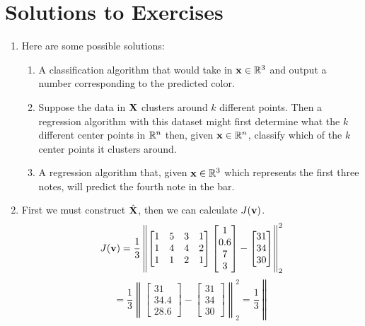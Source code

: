 \section{Solutions to Exercises}
\begin{enumerate}
    \item Here are some possible solutions:
    \begin{enumerate}
        \item A classification algorithm that would take in $\vx \in \R^3$ and output a number corresponding to the predicted color.
        \item Suppose the data in $\MX$ clusters around $k$ different points. Then a regression algorithm with this dataset might first determine what the $k$ different center points in $\R^n$ then, given $\vx \in \R^n$, classify which of the $k$ center points it clusters around.
        \item A regression algorithm that, given $\vx \in \R^3$ which represents the first three notes, will predict the fourth note in the bar.
    \end{enumerate}
    \item First we must construct $\hat{\MX}$, then we can calculate $J(\vv)$.
    $$ J(\vv) = \frac{1}{3} \left\lVert
    \begin{bmatrix}
    1 & 5 & 3 & 1\\
    1 & 4 & 4 & 2\\
    1 & 1 & 2 & 1
    \end{bmatrix}
    \begin{bmatrix}
    1\\
    0.6\\
    7\\
    3
    \end{bmatrix}
    -
    \begin{bmatrix}
    31\\
    34\\
    30
    \end{bmatrix}
    \right\rVert_2^2$$
    $$
    =
    \frac{1}{3} \left\lVert
    \begin{bmatrix}
    31\\34.4\\28.6
    \end{bmatrix}
    -
    \begin{bmatrix}
    31\\34\\30
    \end{bmatrix}\right\rVert_2^2
    =
    \frac{1}{3} \left\lVert
$$
\end{enumerate}
